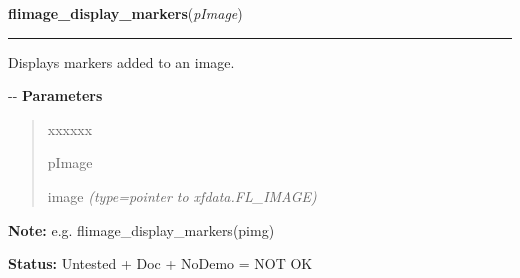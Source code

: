     \label{xformslib:flflimage:flimage_display_markers}

    \vspace{0.5ex}

\hspace{.8\funcindent}\begin{boxedminipage}{\funcwidth}

    \raggedright \textbf{flimage\_display\_markers}(\textit{pImage})

    \vspace{-1.5ex}

    \rule{\textwidth}{0.5\fboxrule}
\setlength{\parskip}{2ex}

Displays markers added to an image.

-{}-
\setlength{\parskip}{1ex}
      \textbf{Parameters}
      \vspace{-1ex}

      \begin{quote}
        \begin{Ventry}{xxxxxx}

          \item[pImage]


image
            {\it (type=pointer to xfdata.FL\_IMAGE)}

        \end{Ventry}

      \end{quote}

\textbf{Note:} 
e.g. flimage\_display\_markers(pimg)


\textbf{Status:} 
Untested + Doc + NoDemo = NOT OK


    \end{boxedminipage}

    \label{xformslib:flflimage:flimage_dup_}

    \vspace{0.5ex}


